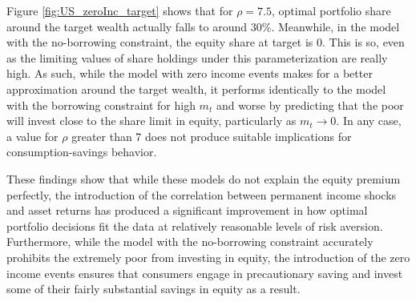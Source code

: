 Figure \ref{fig:US_zeroInc_target} shows that for $\rho = 7.5$, optimal portfolio share around the target wealth actually falls to around 30\%. Meanwhile, in the model with the no-borrowing constraint, the equity share at target is 0. This is so, even as the limiting values of share holdings under this parameterization are really high. As such, while the model with zero income events makes for a better approximation around the target wealth, it performs identically to the model with the borrowing constraint for high $m_t$ and worse by predicting that the poor will invest close to the share limit in equity, particularly as $m_t \to 0$. In any case, a value for $\rho$ greater than 7 does not produce suitable implications for consumption-savings behavior.

These findings show that while these models do not explain the equity premium perfectly, the introduction of the correlation between permanent income shocks and asset returns has produced a significant improvement in how optimal portfolio decisions fit the data at relatively reasonable levels of risk aversion. Furthermore, while the model with the no-borrowing constraint accurately prohibits the extremely poor from investing in equity, the introduction of the zero income events ensures that consumers engage in precautionary saving and invest some of their fairly substantial savings in equity as a result.